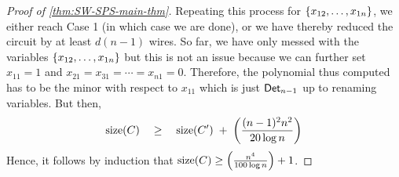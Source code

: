 \begin{proof}[Proof of \autoref{thm:SW-SPS-main-thm}]
Repeating this process for $\left\{x_{12}, \ldots, x_{1n}\right\}$, we either reach Case 1 (in which case we are done), or we have thereby reduced the circuit by at least $d(n-1)$ wires. So far, we have only messed with the variables $\left\{x_{12},\ldots, x_{1n}\right\}$ but this is not an issue because we can further set $x_{11} = 1$ and $x_{21} = x_{31} = \cdots = x_{n1} = 0$. Therefore, the polynomial thus computed has to be the minor with respect to $x_{11}$ which is just $\operatorname{\mathsf{Det}}_{n-1}$ up to renaming variables. But then,
\[
\mathrm{size}(C) \quad \geq \quad \mathrm{size}(C') \;+\; \left(\frac{(n-1)^2 n^2}{20\log n}\right)
\]
Hence, it follows by induction that $\mathrm{size}(C) \geq \left(\frac{n^4}{100\log n}\right) + 1$.
\end{proof}

